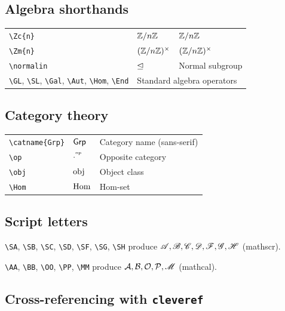 \documentclass[11pt]{scrartcl}
\begin{document}
\subsection{Algebra shorthands}

\begin{center}
\begin{tabular}{lll}
    \verb|\Zc{n}|     & $\mathbb{Z}/n\mathbb{Z}$     & $\mathbb{Z}/n\mathbb{Z}$ \\
    \verb|\Zm{n}|     & $(\mathbb{Z}/n\mathbb{Z})^\times$     & $(\mathbb{Z}/n\mathbb{Z})^\times$ \\
    \verb|\normalin|  & $\trianglelefteq$  & Normal subgroup \\
    \verb|\GL|, \verb|\SL|, \verb|\Gal|, \verb|\Aut|, \verb|\Hom|, \verb|\End|
                      & \multicolumn{2}{l}{Standard algebra operators} \\
\end{tabular}
\end{center}

\subsection{Category theory}

\begin{center}
\begin{tabular}{lll}
    \verb|\catname{Grp}| & $\mathsf{Grp}$ & Category name (sans-serif) \\
    \verb|\op|           & $\cdot^{^{\mathrm{op}}}$   & Opposite category \\
    \verb|\obj|          & $\operatorname{obj}$          & Object class \\
    \verb|\Hom|          & $\operatorname{Hom}$          & Hom-set \\
\end{tabular}
\end{center}

\subsection{Script letters}

\verb|\SA|, \verb|\SB|, \verb|\SC|, \verb|\SD|, \verb|\SF|, \verb|\SG|, \verb|\SH|
produce $\mathscr{A}, \mathscr{B}, \mathscr{C}, \mathscr{D}, \mathscr{F}, \mathscr{G}, \mathscr{H}$ (mathscr).

\verb|\AA|, \verb|\BB|, \verb|\OO|, \verb|\PP|, \verb|\MM|
produce $\mathcal{A}, \mathcal{B}, \mathcal{O}, \mathcal{P}, \mathscr{M}$ (mathcal).

\subsection{Cross-referencing with \texttt{cleveref}}
\end{document}
